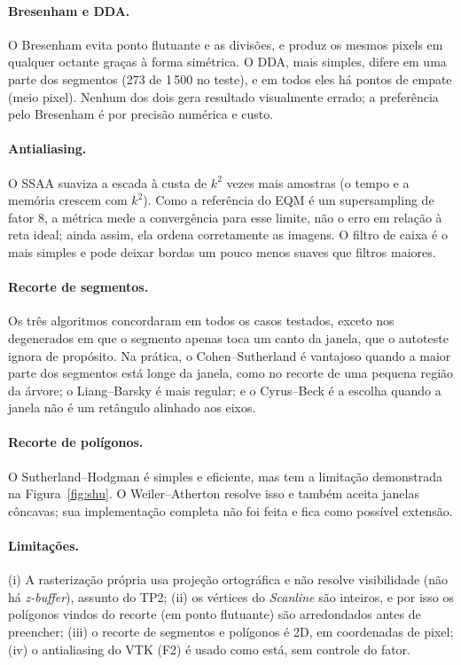 \documentclass[11pt, a4paper]{article}
\begin{document}
\paragraph{Bresenham e DDA.} O Bresenham evita ponto flutuante e as divisões, e
produz os mesmos pixels em qualquer octante graças à forma simétrica. O DDA, mais simples,
difere em uma parte dos segmentos (273 de 1\,500 no teste), e em todos eles há pontos de empate (meio pixel).
Nenhum dos dois gera resultado visualmente errado; a preferência pelo Bresenham é
por precisão numérica e custo.

\paragraph{Antialiasing.} O SSAA suaviza a escada à custa de $k^2$ vezes mais
amostras (o tempo e a memória crescem com $k^2$). Como a referência do EQM é um
supersampling de fator $8$, a métrica mede a convergência para esse limite, não o erro em relação
à reta ideal; ainda assim, ela ordena corretamente as imagens. O filtro de caixa
é o mais simples e pode deixar bordas um pouco menos suaves que filtros maiores.

\paragraph{Recorte de segmentos.} Os três algoritmos concordaram em todos os casos testados,
exceto nos degenerados em que o segmento apenas toca um canto da janela, que o
autoteste ignora de propósito. Na prática, o Cohen--Sutherland é vantajoso quando a
maior parte dos segmentos está longe da janela, como no recorte de uma pequena região
da árvore; o Liang--Barsky é mais regular; e o Cyrus--Beck é a escolha quando a janela não é um
retângulo alinhado aos eixos.

\paragraph{Recorte de polígonos.} O Sutherland--Hodgman é simples e eficiente, mas
tem a limitação demonstrada na Figura~\ref{fig:shu}. O Weiler--Atherton resolve isso
e também aceita janelas côncavas; sua implementação completa não foi feita e
fica como possível extensão.

\paragraph{Limitações.} (i) A rasterização própria usa projeção ortográfica e
não resolve visibilidade (não há \emph{z-buffer}), assunto do TP2;
(ii) os vértices do \emph{Scanline} são inteiros, e por isso os polígonos vindos do
recorte (em ponto flutuante) são arredondados antes de preencher;
(iii) o recorte de segmentos e polígonos é 2D, em coordenadas de pixel;
(iv) o antialiasing do VTK (F2) é usado como está, sem controle do fator.
\end{document}
